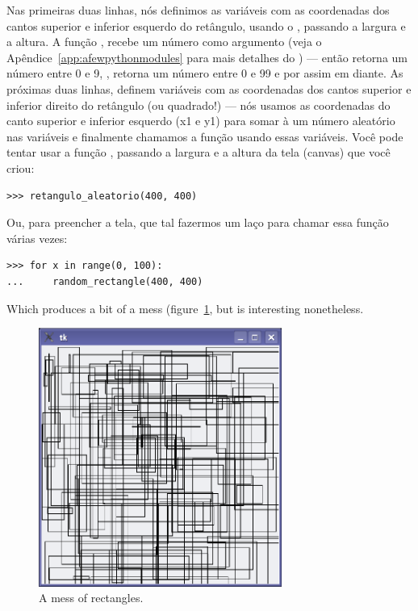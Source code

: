 Nas primeiras duas linhas, nós definimos as variáveis com as coordenadas dos cantos superior e inferior esquerdo do retângulo, usando o , passando a largura e a altura. A função , recebe um número como argumento (veja o Apêndice~\ref{app:afewpythonmodules} para mais detalhes do ) --- então  retorna um número entre 0 e 9, , retorna um número entre 0 e 99 e por assim em diante. As próximas duas linhas, definem variáveis com as coordenadas dos cantos superior e inferior direito do retângulo (ou quadrado!) --- nós usamos as coordenadas do canto superior e inferior esquerdo (x1 e y1) para somar à um número aleatório nas variáveis e finalmente chamamos a função  usando essas variáveis. Você pode tentar usar a função , passando a largura e a altura da tela (canvas) que você criou:

\begin{listing}
\begin{verbatim}
>>> retangulo_aleatorio(400, 400)
\end{verbatim}
\end{listing}

\noindent
Ou, para preencher a tela, que tal fazermos um laço para chamar essa função várias vezes:

\begin{listing}
\begin{verbatim}
>>> for x in range(0, 100):
...     random_rectangle(400, 400)
\end{verbatim}
\end{listing}

\noindent
Which produces a bit of a mess (figure~\ref{fig34}, but is interesting nonetheless.

\begin{figure}
\begin{center}
\includegraphics[width=80mm]{eps/figure34.eps}
\end{center}
\caption{A mess of rectangles.}\label{fig34}
\end{figure}

